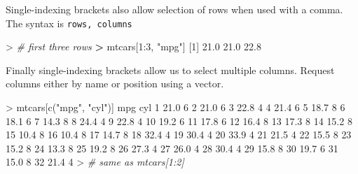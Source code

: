 \documentclass[
]{book}
\newenvironment{Shaded}{\begin{snugshade}}{\end{snugshade}}
\newcommand{\CommentTok}[1]{\textcolor[rgb]{0.56,0.35,0.01}{\textit{#1}}}
\newcommand{\DecValTok}[1]{\textcolor[rgb]{0.00,0.00,0.81}{#1}}
\newcommand{\ErrorTok}[1]{\textcolor[rgb]{0.64,0.00,0.00}{\textbf{#1}}}
\newcommand{\FloatTok}[1]{\textcolor[rgb]{0.00,0.00,0.81}{#1}}
\newcommand{\FunctionTok}[1]{\textcolor[rgb]{0.00,0.00,0.00}{#1}}
\newcommand{\NormalTok}[1]{#1}
\newcommand{\SpecialCharTok}[1]{\textcolor[rgb]{0.00,0.00,0.00}{#1}}
\newcommand{\StringTok}[1]{\textcolor[rgb]{0.31,0.60,0.02}{#1}}
\begin{document}
Single-indexing brackets also allow selection of rows when used with a comma. The syntax is \texttt{rows,\ columns}

\begin{Shaded}
\begin{Highlighting}[]
\SpecialCharTok{\textgreater{}} \CommentTok{\# first three rows}
\ErrorTok{\textgreater{}}\NormalTok{ mtcars[}\DecValTok{1}\SpecialCharTok{:}\DecValTok{3}\NormalTok{, }\StringTok{"mpg"}\NormalTok{]}
\NormalTok{[}\DecValTok{1}\NormalTok{] }\FloatTok{21.0} \FloatTok{21.0} \FloatTok{22.8}
\end{Highlighting}
\end{Shaded}

Finally single-indexing brackets allow us to select multiple columns. Request columns either by name or position using a vector.

\begin{Shaded}
\begin{Highlighting}[]
\SpecialCharTok{\textgreater{}}\NormalTok{ mtcars[}\FunctionTok{c}\NormalTok{(}\StringTok{"mpg"}\NormalTok{, }\StringTok{"cyl"}\NormalTok{)] }
\NormalTok{    mpg cyl}
\DecValTok{1}  \FloatTok{21.0}   \DecValTok{6}
\DecValTok{2}  \FloatTok{21.0}   \DecValTok{6}
\DecValTok{3}  \FloatTok{22.8}   \DecValTok{4}
\DecValTok{4}  \FloatTok{21.4}   \DecValTok{6}
\DecValTok{5}  \FloatTok{18.7}   \DecValTok{8}
\DecValTok{6}  \FloatTok{18.1}   \DecValTok{6}
\DecValTok{7}  \FloatTok{14.3}   \DecValTok{8}
\DecValTok{8}  \FloatTok{24.4}   \DecValTok{4}
\DecValTok{9}  \FloatTok{22.8}   \DecValTok{4}
\DecValTok{10} \FloatTok{19.2}   \DecValTok{6}
\DecValTok{11} \FloatTok{17.8}   \DecValTok{6}
\DecValTok{12} \FloatTok{16.4}   \DecValTok{8}
\DecValTok{13} \FloatTok{17.3}   \DecValTok{8}
\DecValTok{14} \FloatTok{15.2}   \DecValTok{8}
\DecValTok{15} \FloatTok{10.4}   \DecValTok{8}
\DecValTok{16} \FloatTok{10.4}   \DecValTok{8}
\DecValTok{17} \FloatTok{14.7}   \DecValTok{8}
\DecValTok{18} \FloatTok{32.4}   \DecValTok{4}
\DecValTok{19} \FloatTok{30.4}   \DecValTok{4}
\DecValTok{20} \FloatTok{33.9}   \DecValTok{4}
\DecValTok{21} \FloatTok{21.5}   \DecValTok{4}
\DecValTok{22} \FloatTok{15.5}   \DecValTok{8}
\DecValTok{23} \FloatTok{15.2}   \DecValTok{8}
\DecValTok{24} \FloatTok{13.3}   \DecValTok{8}
\DecValTok{25} \FloatTok{19.2}   \DecValTok{8}
\DecValTok{26} \FloatTok{27.3}   \DecValTok{4}
\DecValTok{27} \FloatTok{26.0}   \DecValTok{4}
\DecValTok{28} \FloatTok{30.4}   \DecValTok{4}
\DecValTok{29} \FloatTok{15.8}   \DecValTok{8}
\DecValTok{30} \FloatTok{19.7}   \DecValTok{6}
\DecValTok{31} \FloatTok{15.0}   \DecValTok{8}
\DecValTok{32} \FloatTok{21.4}   \DecValTok{4}
\SpecialCharTok{\textgreater{}} \CommentTok{\# same as mtcars[1:2] }
\end{Highlighting}
\end{Shaded}
\end{document}
